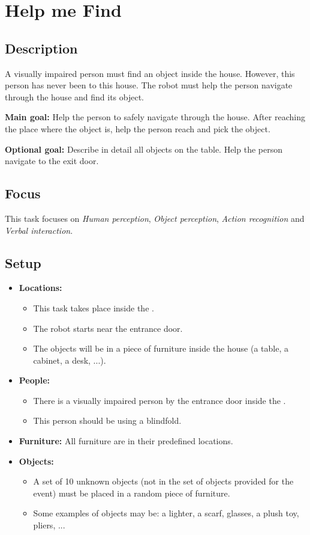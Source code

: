 \section{Help me Find}
\label{test:help-me-find}

\subsection*{Description}
A visually impaired person must find an object inside the house. However, this person has never been to this house. The robot must help the person navigate through the house and find its object.

\textbf{Main goal:}
Help the person to safely navigate through the house. After reaching the place where the object is, help the person reach and pick the object.

\textbf{Optional goal:}
Describe in detail all objects on the table.
Help the person navigate to the exit door.


\subsection*{Focus}
This task focuses on
\textit{Human perception},
\textit{Object perception},
\textit{Action recognition} and
\textit{Verbal interaction}.

\subsection*{Setup}
\begin{itemize}[nosep]	
	\item \textbf{Locations:} 
	\begin{itemize}
		\item This task takes place inside the \Arena{}.
		\item The robot starts near the entrance door.
		\item The objects will be in a piece of furniture inside the house (a table, a cabinet, a desk, ...).
	\end{itemize}	 
	\item \textbf{People:} 
	\begin{itemize}
		\item There is a visually impaired person by the entrance door inside the \Arena{}.
		\item This person should be using a blindfold.
	\end{itemize}
	\item \textbf{Furniture:} All furniture are in their predefined locations.
	\item \textbf{Objects:} 
	\begin{itemize}
		\item A set of 10 unknown objects (not in the set of objects provided for the event) must be placed in a random piece of furniture.
		\item Some examples of objects may be: a lighter, a scarf, glasses, a plush toy, pliers, ...
	\end{itemize}
\end{itemize}

